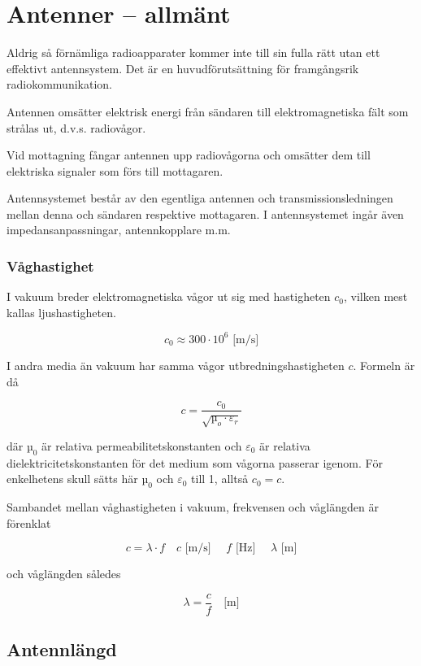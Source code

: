 \section{Antenner -- allmänt}

Aldrig så förnämliga radioapparater kommer inte till sin fulla rätt
utan ett effektivt antennsystem. Det är en huvudförutsättning för
framgångsrik radiokommunikation.

Antennen omsätter elektrisk energi från sändaren till
elektromagnetiska fält som strålas ut, d.v.s. radiovågor.

Vid mottagning fångar antennen upp radiovågorna och omsätter dem till
elektriska signaler som förs till mottagaren.

Antennsystemet består av den egentliga antennen och
transmissionsledningen mellan denna och sändaren respektive
mottagaren. I antennsystemet ingår även impedansanpassningar,
antennkopplare m.m.


\subsubsection{Våghastighet}
\label{ljushastigheten}

I vakuum breder elektromagnetiska vågor ut sig med hastigheten
\(c_0\), vilken mest kallas ljushastigheten.

\[c_0 \approx 300 \cdot 10^6 \text{ [m/s]}\]

I andra media än vakuum har samma vågor utbredningshastigheten
\(c\). Formeln är då

\[c = \frac{c_0}{\sqrt{µ_o \cdot \varepsilon_r}}\]

där \(µ_0\) är relativa permeabilitetskonstanten och \(\varepsilon_0\)
är relativa dielektricitetskonstanten för det medium som vågorna
passerar igenom.  För enkelhetens skull sätts här \(µ_0\) och
\(\varepsilon_0\) till 1, alltså \(c_0 = c\).

Sambandet mellan våghastigheten i vakuum, frekvensen och våglängden är förenklat

\[ c = \lambda \cdot f \quad c\text{ [m/s] }\quad f\text{ [Hz] } \quad \lambda\text{ [m]}\]

och våglängden således

\[ \lambda = \frac{c}{f} \quad \text{[m]} \]

\subsection{Antennlängd}

